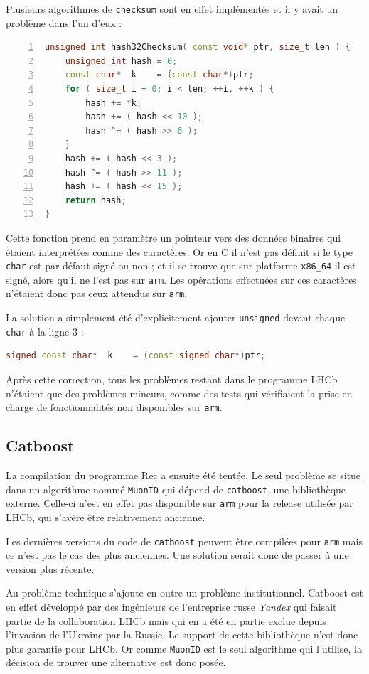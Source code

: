 \documentclass[a4paper,11pt]{report}
\begin{document}
Plusieurs algorithmes de \verb'checksum' sont en effet implémentés et il y avait un problème dans l'un d'eux :

\begin{lstlisting}[language=c++,numbers=left]
unsigned int hash32Checksum( const void* ptr, size_t len ) {
    unsigned int hash = 0;
    const char*  k    = (const char*)ptr;
    for ( size_t i = 0; i < len; ++i, ++k ) {
        hash += *k;
        hash += ( hash << 10 );
        hash ^= ( hash >> 6 );
    }
    hash += ( hash << 3 );
    hash ^= ( hash >> 11 );
    hash += ( hash << 15 );
    return hash;
}
\end{lstlisting}

Cette fonction prend en paramètre un pointeur vers des données binaires qui étaient interprétées comme des caractères.
Or en C il n'est pas définit si le type \verb'char' est par défaut signé ou non ; et il se trouve que sur platforme \verb'x86_64' il est signé, alors qu'il ne l'est pas sur \verb'arm'.
Les opérations effectuées sur ces caractères n'étaient donc pas ceux attendus sur \verb'arm'.

La solution a simplement été d'explicitement ajouter \verb'unsigned' devant chaque \verb'char' à la ligne 3 :
\begin{lstlisting}[language=c++]
signed const char*  k    = (const signed char*)ptr;
\end{lstlisting}

Après cette correction, tous les problèmes restant dans le programme LHCb n'étaient que des problèmes mineurs, comme des tests qui vérifiaient la prise en charge de fonctionnalités non disponibles sur \verb'arm'.

\subsection{Catboost}
La compilation du programme Rec a ensuite été tentée.
Le seul problème se situe dans un algorithme nommé \verb'MuonID' qui dépend de \verb'catboost', une bibliothèque externe.
Celle-ci n'est en effet pas disponible sur \verb'arm' pour la release utilisée par LHCb, qui s'avère être relativement ancienne.

Les dernières versions du code de \verb'catboost' peuvent être compilées pour \verb'arm' mais ce n'est pas le cas des plus anciennes.
Une solution serait donc de passer à une version plus récente.

Au problème technique s'ajoute en outre un problème institutionnel.
Catboost est en effet développé par des ingénieurs de l'entreprise russe \emph{Yandex} qui faisait partie de la collaboration LHCb mais qui en a été en partie exclue depuis l'invasion de l'Ukraine par la Russie.
Le support de cette bibliothèque n'est donc plus garantie pour LHCb.
Or comme \verb'MuonID' est le seul algorithme qui l'utilise, la décision de trouver une alternative est donc posée.
\end{document}
